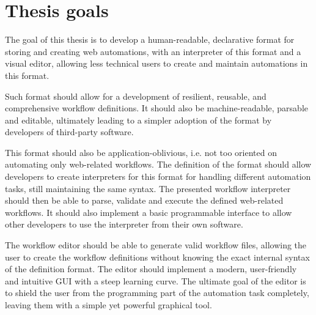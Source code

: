 \section*{Thesis goals}
The goal of this thesis is to develop a human-readable, declarative format for storing and creating web automations, with an interpreter of this format and a visual editor, allowing less technical users to create and maintain automations in this format.
\par
Such format should allow for a development of resilient, reusable, and comprehensive workflow definitions. 
It should also be machine-readable, parsable and editable, ultimately leading to a simpler adoption of the format by developers of third-party software.
\par
This format should also be application-oblivious, i.e. not too oriented on automating only web-related workflows.
The definition of the format should allow developers to create interpreters for this format for handling different automation tasks, still maintaining the same syntax.
The presented workflow interpreter should then be able to parse, validate and execute the defined web-related workflows. 
It should also implement a basic programmable interface to allow other developers to use the interpreter from their own software.
\par
The workflow editor should be able to generate valid workflow files, allowing the user to create the workflow definitions without knowing the exact internal syntax of the definition format.
The editor should implement a modern, user-friendly and intuitive \ac{GUI} with a steep learning curve.
The ultimate goal of the editor is to shield the user from the programming part of the automation task completely, leaving them with a simple yet powerful graphical tool.